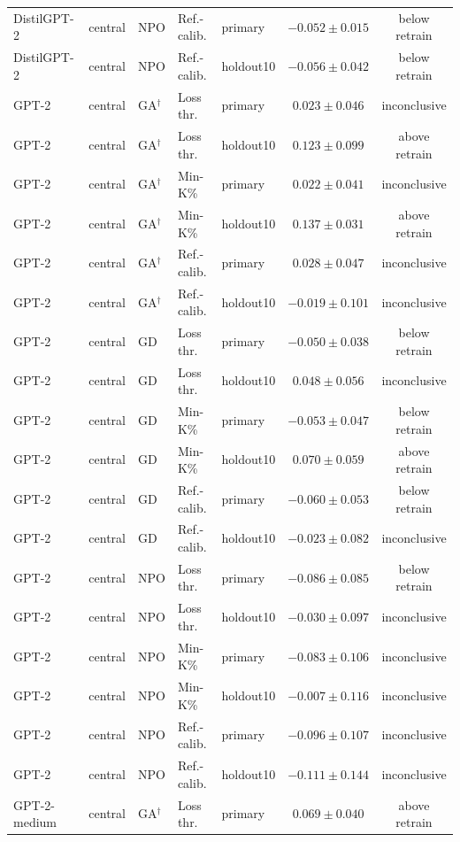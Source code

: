 \begin{table}[t]
\begin{tabular*}{\textwidth}{@{\extracolsep{\fill}}lllllcc@{}}
DistilGPT-2 & central & NPO & Ref.-calib. & primary & $-0.052 \pm 0.015$ & below retrain \\
DistilGPT-2 & central & NPO & Ref.-calib. & holdout10 & $-0.056 \pm 0.042$ & below retrain \\
GPT-2 & central & GA$^{\dagger}$ & Loss thr. & primary & $0.023 \pm 0.046$ & inconclusive \\
GPT-2 & central & GA$^{\dagger}$ & Loss thr. & holdout10 & $0.123 \pm 0.099$ & above retrain \\
GPT-2 & central & GA$^{\dagger}$ & Min-K\% & primary & $0.022 \pm 0.041$ & inconclusive \\
GPT-2 & central & GA$^{\dagger}$ & Min-K\% & holdout10 & $0.137 \pm 0.031$ & above retrain \\
GPT-2 & central & GA$^{\dagger}$ & Ref.-calib. & primary & $0.028 \pm 0.047$ & inconclusive \\
GPT-2 & central & GA$^{\dagger}$ & Ref.-calib. & holdout10 & $-0.019 \pm 0.101$ & inconclusive \\
GPT-2 & central & GD & Loss thr. & primary & $-0.050 \pm 0.038$ & below retrain \\
GPT-2 & central & GD & Loss thr. & holdout10 & $0.048 \pm 0.056$ & inconclusive \\
GPT-2 & central & GD & Min-K\% & primary & $-0.053 \pm 0.047$ & below retrain \\
GPT-2 & central & GD & Min-K\% & holdout10 & $0.070 \pm 0.059$ & above retrain \\
GPT-2 & central & GD & Ref.-calib. & primary & $-0.060 \pm 0.053$ & below retrain \\
GPT-2 & central & GD & Ref.-calib. & holdout10 & $-0.023 \pm 0.082$ & inconclusive \\
GPT-2 & central & NPO & Loss thr. & primary & $-0.086 \pm 0.085$ & below retrain \\
GPT-2 & central & NPO & Loss thr. & holdout10 & $-0.030 \pm 0.097$ & inconclusive \\
GPT-2 & central & NPO & Min-K\% & primary & $-0.083 \pm 0.106$ & inconclusive \\
GPT-2 & central & NPO & Min-K\% & holdout10 & $-0.007 \pm 0.116$ & inconclusive \\
GPT-2 & central & NPO & Ref.-calib. & primary & $-0.096 \pm 0.107$ & inconclusive \\
GPT-2 & central & NPO & Ref.-calib. & holdout10 & $-0.111 \pm 0.144$ & inconclusive \\
GPT-2-medium & central & GA$^{\dagger}$ & Loss thr. & primary & $0.069 \pm 0.040$ & above retrain \\

\end{tabular*}
\end{table}
